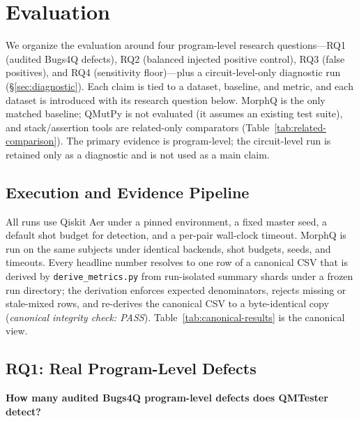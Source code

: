 \section{Evaluation}

We organize the evaluation around four program-level research questions---RQ1 (audited Bugs4Q defects), RQ2 (balanced injected positive control), RQ3 (false positives), and RQ4 (sensitivity floor)---plus a circuit-level-only diagnostic run (\S\ref{sec:diagnostic}). Each claim is tied to a dataset, baseline, and metric, and each dataset is introduced with its research question below. MorphQ is the only matched baseline; QMutPy is not evaluated (it assumes an existing test suite), and stack/assertion tools are related-only comparators (Table~\ref{tab:related-comparison}). The primary evidence is program-level; the circuit-level run is retained only as a diagnostic and is not used as a main claim.

\subsection{Execution and Evidence Pipeline}

All runs use Qiskit Aer under a pinned environment, a fixed master seed, a default shot budget for detection, and a per-pair wall-clock timeout. MorphQ is run on the same subjects under identical backends, shot budgets, seeds, and timeouts. Every headline number resolves to one row of a canonical CSV that is derived by \texttt{derive\_metrics.py} from run-isolated summary shards under a frozen run directory; the derivation enforces expected denominators, rejects missing or stale-mixed rows, and re-derives the canonical CSV to a byte-identical copy (\emph{canonical integrity check: PASS}). Table~\ref{tab:canonical-results} is the canonical view.



\subsection{RQ1: Real Program-Level Defects}
\label{sec:rq1}

\noindent\textbf{How many audited Bugs4Q program-level defects does QMTester detect?}

